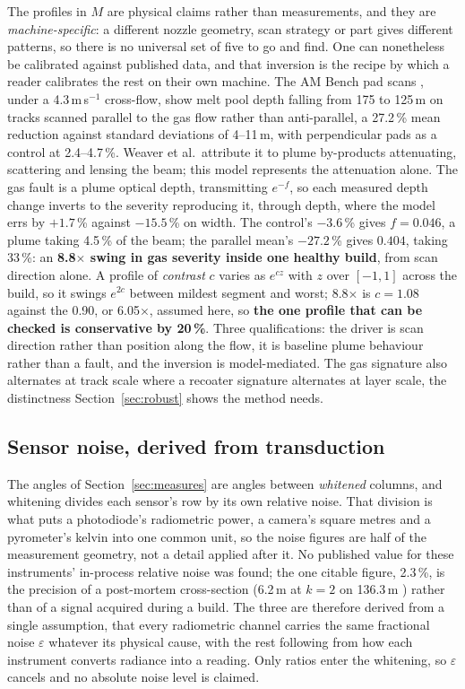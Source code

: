 \documentclass[final,5p,times,twocolumn]{elsarticle}
\begin{document}
The profiles in $M$ are physical claims rather than measurements, and they are
\emph{machine-specific}: a different nozzle geometry, scan strategy or part
gives different patterns, so there is no universal set of five to go and find.
One can nonetheless be calibrated against published data, and that inversion is
the recipe by which a reader calibrates the rest on their own machine. The
AM Bench pad scans \cite{Weaver2024}, under a 4.3\,m\,s$^{-1}$ cross-flow, show
melt pool depth falling from 175 to 125\,\textmu m on tracks scanned parallel to
the gas flow rather than anti-parallel, a 27.2\,\% mean reduction against
standard deviations of 4--11\,\textmu m, with perpendicular pads as a control at
2.4--4.7\,\%. Weaver et al.\ attribute it to plume by-products attenuating,
scattering and lensing the beam; this model represents the attenuation alone.
The gas fault is a plume optical depth, transmitting $e^{-f}$, so each measured
depth change inverts to the severity reproducing it, through depth, where the
model errs by $+1.7$\,\% against $-15.5$\,\% on width. The control's $-3.6$\,\%
gives $f=0.046$, a plume taking 4.5\,\% of the beam; the parallel mean's
$-27.2$\,\% gives $0.404$, taking 33\,\%: an \textbf{8.8$\times$ swing in gas
severity inside one healthy build}, from scan direction alone. A profile of
\emph{contrast} $c$ varies as $e^{cz}$ with $z$ over $[-1,1]$ across the build,
so it swings $e^{2c}$ between mildest segment and worst; 8.8$\times$ is $c=1.08$
against the 0.90, or 6.05$\times$, assumed here, so \textbf{the one profile that
can be checked is conservative by 20\,\%}. Three qualifications: the driver is
scan direction rather than position along the flow, it is baseline plume
behaviour rather than a fault, and the inversion is model-mediated. The gas
signature also alternates at track scale where a recoater signature alternates
at layer scale, the distinctness Section~\ref{sec:robust} shows the method
needs.

\subsection{Sensor noise, derived from transduction}
\label{sec:noise}

The angles of Section~\ref{sec:measures} are angles between \emph{whitened}
columns, and whitening divides each sensor's row by its own relative noise. That
division is what puts a photodiode's radiometric power, a camera's square metres
and a pyrometer's kelvin into one common unit, so the noise figures are half of
the measurement geometry, not a detail applied after it. No published value for
these instruments' in-process relative noise was found; the one citable
figure, 2.3\,\%, is the precision of a post-mortem cross-section
(6.2\,\textmu m at $k=2$ on 136.3\,\textmu m \cite{Weaver2024}) rather than of a
signal acquired during a build. The three are therefore derived from a single
assumption, that every radiometric channel carries the same fractional noise
$\varepsilon$ whatever its physical cause, with the rest following from how each
instrument converts radiance into a reading. Only ratios enter the whitening, so
$\varepsilon$ cancels and no absolute noise level is claimed.
\end{document}
